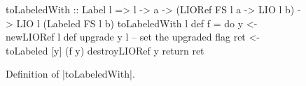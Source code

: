 \begin{figure}
\vspace*{-5pt}
\begin{code}
toLabeledWith :: Label l =>
      l -> a -> (LIORef FS l a -> LIO l b)
  ->  LIO l (Labeled FS l b)
toLabeledWith l def f =
    do  y    <-  newLIORef l def
        upgrade y l -- set the upgraded flag
        ret  <-  toLabeled [y] (f y)
        destroyLIORef y
        return ret
\end{code}
\caption{Definition of |toLabeledWith|.\label{fig:toLabeledWith-semantics}}
\vspace*{-5pt}
\end{figure}

